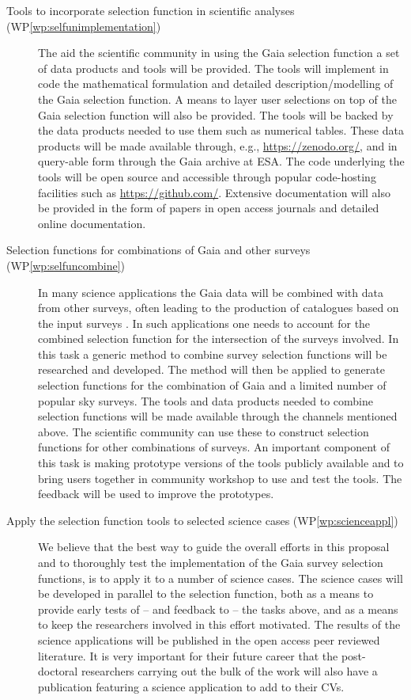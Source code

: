 \begin{description}
    \item[Tools to incorporate selection function in scientific analyses (WP\ref{wp:selfunimplementation})] The aid the scientific community in using the Gaia selection function a set of data products and tools will be provided. The tools will implement in code the mathematical formulation and detailed description/modelling of the Gaia selection function. A means to layer user selections on top of the Gaia selection function will also be provided. The tools will be backed by the data products needed to use them such as numerical tables. These data products will be made available through, e.g., \url{https://zenodo.org/}, and in query-able form through the Gaia archive at ESA. The code underlying the tools will be open source and accessible through popular code-hosting facilities such as \url{https://github.com/}. Extensive documentation will also be provided in the form of papers in open access journals and detailed online documentation.
    \item[Selection functions for combinations of Gaia and other surveys (WP\ref{wp:selfuncombine})] In many science applications the Gaia data will be combined with data from other surveys, often leading to the production of catalogues based on the input surveys \citep[see for example][]{2019A&A...628A..94A}. In such applications one needs to account for the combined selection function for the intersection of the surveys involved. In this task a generic method to combine survey selection functions will be researched and developed. The method will then be applied to generate selection functions for the combination of Gaia and a limited number of popular sky surveys. The tools and data products needed to combine selection functions will be made available through the channels mentioned above. The scientific community can use these to construct selection functions for other combinations of surveys. An important component of this task is making prototype versions of the tools publicly available and to bring users together in community workshop to use and test the tools. The feedback will be used to improve the prototypes.
    \item[Apply the selection function tools to selected science cases (WP\ref{wp:scienceappl})] We believe that the best way to guide the overall efforts in this proposal and to thoroughly test the implementation of the Gaia survey selection functions, is to apply it to a number of science cases. The science cases will be developed in parallel to the selection function, both as a means to provide early tests of -- and feedback to -- the tasks above, and as a means to keep the researchers involved in this effort motivated. The results of the science applications will be published in the open access peer reviewed literature. It is very important for their future career that the post-doctoral researchers carrying out the bulk of the work will also have a publication featuring a science application to add to their CVs.
\end{description}

